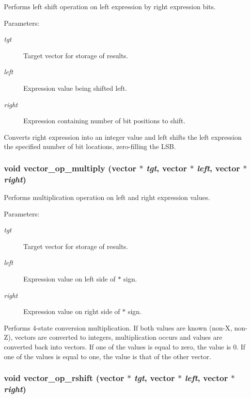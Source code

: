 Performs left shift operation on left expression by right expression bits. 

\begin{Desc}
\item[Parameters:]
\begin{description}
\item[{\em tgt}]Target vector for storage of results. \item[{\em left}]Expression value being shifted left. \item[{\em right}]Expression containing number of bit positions to shift.\end{description}
\end{Desc}
Converts right expression into an integer value and left shifts the left expression the specified number of bit locations, zero-filling the LSB. 
\subsubsection{\setlength{\rightskip}{0pt plus 5cm}void vector\_\-op\_\-multiply ({\bf vector} $\ast$ {\em tgt}, {\bf vector} $\ast$ {\em left}, {\bf vector} $\ast$ {\em right})}\label{vector_8c_a42}


Performs multiplication operation on left and right expression values. 

\begin{Desc}
\item[Parameters:]
\begin{description}
\item[{\em tgt}]Target vector for storage of results. \item[{\em left}]Expression value on left side of $\ast$ sign. \item[{\em right}]Expression value on right side of $\ast$ sign.\end{description}
\end{Desc}
Performs 4-state conversion multiplication. If both values are known (non-X, non-Z), vectors are converted to integers, multiplication occurs and values are converted back into vectors. If one of the values is equal to zero, the value is 0. If one of the values is equal to one, the value is that of the other vector. 
\subsubsection{\setlength{\rightskip}{0pt plus 5cm}void vector\_\-op\_\-rshift ({\bf vector} $\ast$ {\em tgt}, {\bf vector} $\ast$ {\em left}, {\bf vector} $\ast$ {\em right})}\label{vector_8c_a39}


